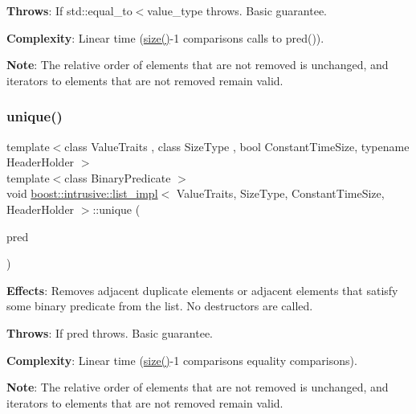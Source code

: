 {\bfseries Throws}\+: If std\+::equal\+\_\+to$<$value\+\_\+type throws. Basic guarantee.

{\bfseries Complexity}\+: Linear time (\hyperlink{classboost_1_1intrusive_1_1list__impl_a9da0074a31566f3a7dbc3cd1a2d752c1}{size()}-\/1 comparisons calls to pred()).

{\bfseries Note}\+: The relative order of elements that are not removed is unchanged, and iterators to elements that are not removed remain valid. \mbox{\label{classboost_1_1intrusive_1_1list__impl_a2d237761bc8d589a706731a9e1b2da2f}} 
\subsubsection{\texorpdfstring{unique()}{unique()}\hspace{0.1cm}{\footnotesize\ttfamily [2/2]}}
{\footnotesize\ttfamily template$<$class Value\+Traits , class Size\+Type , bool Constant\+Time\+Size, typename Header\+Holder $>$ \\
template$<$class Binary\+Predicate $>$ \\
void \hyperlink{classboost_1_1intrusive_1_1list__impl}{boost\+::intrusive\+::list\+\_\+impl}$<$ Value\+Traits, Size\+Type, Constant\+Time\+Size, Header\+Holder $>$\+::unique (\begin{DoxyParamCaption}\item[{Binary\+Predicate}]{pred }\end{DoxyParamCaption})\hspace{0.3cm}{\ttfamily [inline]}}

{\bfseries Effects}\+: Removes adjacent duplicate elements or adjacent elements that satisfy some binary predicate from the list. No destructors are called.

{\bfseries Throws}\+: If pred throws. Basic guarantee.

{\bfseries Complexity}\+: Linear time (\hyperlink{classboost_1_1intrusive_1_1list__impl_a9da0074a31566f3a7dbc3cd1a2d752c1}{size()}-\/1 comparisons equality comparisons).

{\bfseries Note}\+: The relative order of elements that are not removed is unchanged, and iterators to elements that are not removed remain valid. \mbox{\label{classboost_1_1intrusive_1_1list__impl_a782aa8957c448e81553e803349b5f159}} 
